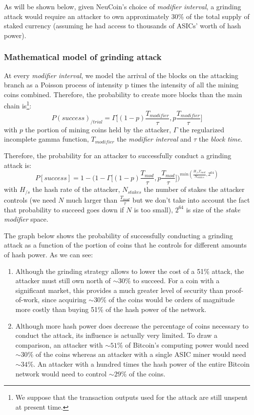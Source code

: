 \documentclass[a4paper,11pt]{article}
\begin{document}
As will be shown below, given NeuCoin's choice of \textit{modifier interval}, a grinding attack would require an attacker to own approximately 30\% of the total supply of staked currency (assuming he had access to thousands of ASICs' worth of hash power).

\subsubsection*{Mathematical model of grinding attack}

At every \textit{modifier interval}, we model the arrival of the blocks on the attacking branch as a Poisson process of intensity p times the intensity of all the mining coins combined. Therefore, the probability to create more blocks than the main chain is\footnote{We suppose that the transaction outputs used for the attack are still unspent at present time.}:
$$P(success)_{/trial}=\Gamma\Big[(1-p)\frac{T_{modifier}}{\tau},p\frac{T_{modifier}}{\tau}\Big]$$
with $p$ the portion of mining coins held by the attacker, $\Gamma$ the regularized incomplete gamma function, $T_{modifier}$ the \textit{modifier interval} and $\tau$ the \textit{block time}.

Therefore, the probability for an attacker to successfully conduct a grinding attack is:
$$P[success]=1-\bigg(1- \Gamma\Big[(1-p)\frac{T_{mod}}{\tau},p\frac{T_{mod}}{\tau}\Big]\bigg)^{min( \frac{ H_{/s}T_{mod} }{N_{stakes}},2^{64}) }$$
with $H_{/s}$ the hash rate of the attacker, $N_{stakes}$ the number of stakes the attacker controls (we need $N$ much larger than $\frac{T_{mod}}{\tau}$ but we don't take into account the fact that probability to succeed goes down if $N$ is too small), $2^{64}$ is size of the \textit{stake modifier} space.

The graph below shows the probability of successfully conducting a grinding attack as a function of the portion of coins that he controls for different amounts of hash power.
As we can see:
\begin{enumerate}
\setlength{\itemsep}{0pt}
\item{Although the grinding strategy allows to lower the cost of a 51\% attack, the attacker must still own north of $\sim30\%$ to succeed. For a coin with a significant market, this provides a much greater level of security than proof-of-work, since acquiring $\sim30\%$ of the coins would be orders of magnitude more costly than buying 51\% of the hash power of the network.}
\item{Although more hash power does decrease the percentage of coins necessary to conduct the attack, its influence is actually very limited. To draw a comparison, an attacker with $\sim51\%$ of Bitcoin's computing power would need $\sim30\%$ of the coins whereas an attacker with a single ASIC miner would need $\sim34\%$. An attacker with a hundred times the hash power of the entire Bitcoin network would need to control $\sim29\%$ of the coins.}
\end{enumerate}
\end{document}
